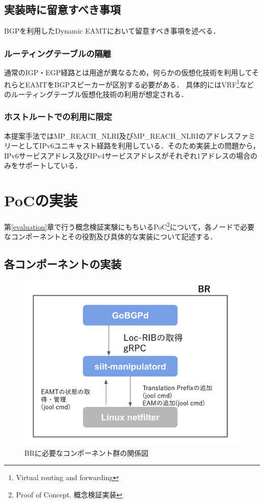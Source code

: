 \subsection{実装時に留意すべき事項}
BGPを利用したDynamic EAMTにおいて留意すべき事項を述べる．
\subsubsection{ルーティングテーブルの隔離}
通常のIGP・EGP経路とは用途が異なるため，何らかの仮想化技術を利用してそれらとEAMTをBGPスピーカーが区別する必要がある．
具体的にはVRF\footnote{Virtual routing and forwarding}などのルーティングテーブル仮想化技術の利用が想定される．

\subsubsection{ホストルートでの利用に限定}
本提案手法ではMP\_REACH\_NLRI及びMP\_REACH\_NLRIのアドレスファミリーとしてIPv6ユニキャスト経路を利用している．そのため実装上の問題から，IPv6サービスアドレス及びIPv4サービスアドレスがそれぞれ1アドレスの場合のみをサポートしている．


\section{PoCの実装}
\label{implementation:poc}
第\ref{evaluation}章で行う概念検証実験にもちいるPoC\footnote{Proof of Concept. 概念検証実装}について，各ノードで必要なコンポーネントとその役割及び具体的な実装について記述する．


\subsection{各コンポーネントの実装}
\label{implementation:poc:components}

\begin{figure}[h]
    \begin{center}
    \includegraphics[width=12cm,pagebox=cropbox,clip]{img/poc_implementation.png}
    \end{center}
    \caption{BRに必要なコンポーネント群の関係図}
    \label{fig:poc_implementation}
\end{figure}


